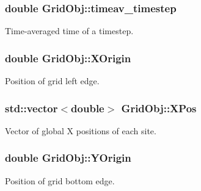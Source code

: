 \subsubsection[{\texorpdfstring{timeav\+\_\+timestep}{timeav_timestep}}]{\setlength{\rightskip}{0pt plus 5cm}double Grid\+Obj\+::timeav\+\_\+timestep}\hypertarget{class_grid_obj_a2ad670e6b9bdd28b5060397800170310}{}\label{class_grid_obj_a2ad670e6b9bdd28b5060397800170310}


Time-\/averaged time of a timestep. 

\subsubsection[{\texorpdfstring{X\+Origin}{XOrigin}}]{\setlength{\rightskip}{0pt plus 5cm}double Grid\+Obj\+::\+X\+Origin}\hypertarget{class_grid_obj_adcd2bcbd5bb4009d7c84097e1356a1fa}{}\label{class_grid_obj_adcd2bcbd5bb4009d7c84097e1356a1fa}


Position of grid left edge. 

\subsubsection[{\texorpdfstring{X\+Pos}{XPos}}]{\setlength{\rightskip}{0pt plus 5cm}std\+::vector$<$double$>$ Grid\+Obj\+::\+X\+Pos}\hypertarget{class_grid_obj_af31df133bf9419da6222a0dbb4e54bab}{}\label{class_grid_obj_af31df133bf9419da6222a0dbb4e54bab}


Vector of global X positions of each site. 

\subsubsection[{\texorpdfstring{Y\+Origin}{YOrigin}}]{\setlength{\rightskip}{0pt plus 5cm}double Grid\+Obj\+::\+Y\+Origin}\hypertarget{class_grid_obj_a30c070fe26def1366db2b3e66b3cd29d}{}\label{class_grid_obj_a30c070fe26def1366db2b3e66b3cd29d}


Position of grid bottom edge. 

